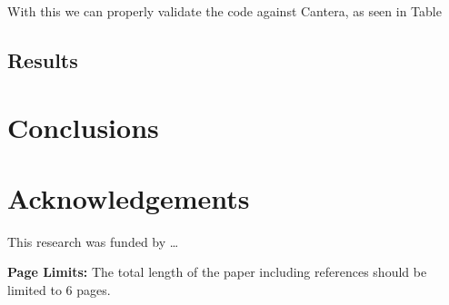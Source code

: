 \documentclass[12pt]{ussci}
\begin{document}
With this we can properly validate the code against Cantera, as seen in Table~

\subsection{Results}
\label{S:results}


\label{results}

\section{Conclusions}
%

\section{Acknowledgements}
This research was funded by \ldots

\noindent\textbf{Page Limits:} The total length of the paper including references should be limited to 6 pages.

\printbibliography[heading=bibintoc]
\end{document}
